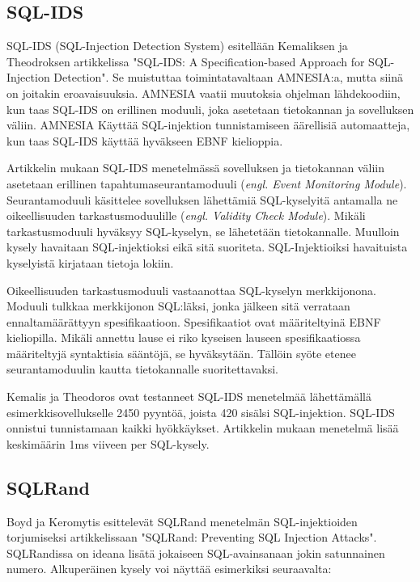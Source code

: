 \documentclass[finnish]{tktltiki2}
\theoremstyle{definition}
\theoremstyle{remark}
\begin{document}
	\subsection{SQL-IDS}
	SQL-IDS (SQL-Injection Detection System) esitellään Kemaliksen ja Theodroksen artikkelissa "SQL-IDS: A Specification-based Approach for SQL-Injection Detection"\space\cite{sqlids}. Se muistuttaa toimintatavaltaan AMNESIA:a, mutta siinä on joitakin eroavaisuuksia. AMNESIA vaatii muutoksia ohjelman lähdekoodiin, kun taas SQL-IDS on erillinen moduuli, joka asetetaan tietokannan ja sovelluksen väliin. AMNESIA Käyttää SQL-injektion tunnistamiseen äärellisiä automaatteja, kun taas SQL-IDS käyttää hyväkseen EBNF kielioppia.
	
	Artikkelin mukaan SQL-IDS menetelmässä sovelluksen ja tietokannan väliin asetetaan erillinen tapahtumaseurantamoduuli (\textit{engl. Event Monitoring Module}). Seurantamoduuli käsittelee sovelluksen lähettämiä SQL-kyselyitä antamalla ne oikeellisuuden tarkastusmoduulille (\textit{engl. Validity Check Module}). Mikäli tarkastusmoduuli hyväksyy SQL-kyselyn, se lähetetään tietokannalle. Muulloin kysely havaitaan SQL-injektioksi eikä sitä suoriteta. SQL-Injektioiksi havaituista kyselyistä kirjataan tietoja lokiin.
	
	Oikeellisuuden tarkastusmoduuli vastaanottaa SQL-kyselyn merkkijonona. Moduuli tulkkaa merkkijonon SQL:läksi, jonka jälkeen sitä verrataan ennaltamäärättyyn spesifikaatioon. Spesifikaatiot ovat määriteltyinä EBNF kieliopilla. Mikäli annettu lause ei riko kyseisen lauseen spesifikaatiossa määriteltyjä syntaktisia sääntöjä, se hyväksytään. Tällöin syöte etenee seurantamoduulin kautta tietokannalle suoritettavaksi.

	Kemalis ja Theodoros ovat testanneet SQL-IDS menetelmää lähettämällä esimerkkisovellukselle 2450 pyyntöä, joista 420 sisälsi SQL-injektion. SQL-IDS onnistui tunnistamaan kaikki hyökkäykset. Artikkelin mukaan menetelmä lisää keskimäärin 1ms viiveen per SQL-kysely.
					

		
	\subsection{SQLRand}
	Boyd ja Keromytis esittelevät SQLRand menetelmän SQL-injektioiden torjumiseksi artikkelissaan "SQLRand: Preventing SQL Injection Attacks"\space \cite{sqlrand}. SQLRandissa on ideana lisätä jokaiseen SQL-avainsanaan jokin satunnainen numero. Alkuperäinen kysely voi näyttää esimerkiksi seuraavalta:
\end{document}
